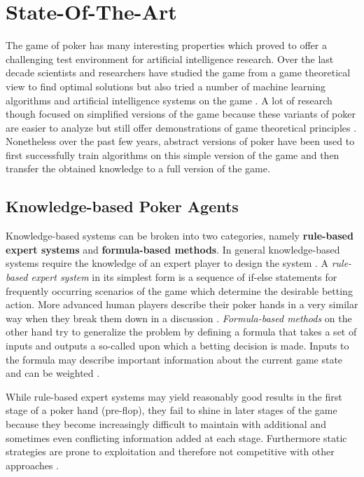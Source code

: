 

\chapter{State-Of-The-Art}
\label{cha:State-Of-The-Art}
The game of poker has many interesting properties which proved to offer a challenging test environment for artificial intelligence research. Over the last decade scientists and researchers have studied the game from a game theoretical view to find optimal solutions but also tried a number of machine learning algorithms and artificial intelligence systems on the game \cite{opp_master, challenge_of_poker}. A lot of research though focused on simplified versions of the game because these variants of poker are easier to analyze but still offer demonstrations of game theoretical principles \cite{challenge_of_poker}. Nonetheless over the past few years, abstract versions of poker have been used to first successfully train algorithms on this simple version of the game and then transfer the obtained knowledge to a full version of the game.
\section{Knowledge-based Poker Agents}
Knowledge-based systems can be broken into two categories, namely \textbf{rule-based expert systems} and \textbf{formula-based methods}. In general knowledge-based systems require the knowledge of an expert player to design the system \cite{review}. A \textit{rule-based expert system} in its simplest form is a sequence of if-else statements for frequently occurring scenarios of the game which determine the desirable betting action. More advanced human players describe their poker hands in a very similar way when they break them down in a discussion \cite{master_nuno}. \textit{Formula-based methods} on the other hand try to generalize the problem by defining a formula that takes a set of inputs and outputs a so-called  upon which a betting decision is made. Inputs to the formula may describe important information about the current game state and can be weighted \cite{review}. \par
While rule-based expert systems may yield reasonably good results in the first stage of a poker hand (pre-flop), they fail to shine in later stages of the game because they become increasingly difficult to maintain with additional and sometimes even conflicting information added at each stage. Furthermore  static strategies are prone to exploitation and therefore not competitive with other approaches \cite{review}.
